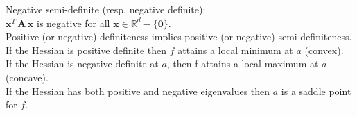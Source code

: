 Negative semi-definite (resp. negative definite):\\

$\mathbf{x}^ T \, \mathbf{A}\, \mathbf{x}$ is negative for all $\mathbf{x}\in \mathbb {R}^ d-\{ \mathbf{0}\}$.\\

Positive (or negative) definiteness implies positive (or negative) semi-definiteness.\\

If the Hessian is positive definite then $f$ attains a local minimum at $a$ (convex).\\

If the Hessian is negative definite at $a$, then f attains a local maximum at $a$ (concave).\\

If the Hessian has both positive and negative eigenvalues then $a$ is a saddle point for $f$.

